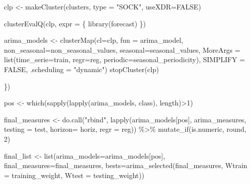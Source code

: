 \documentclass[
]{article}
\newenvironment{Shaded}{\begin{snugshade}}{\end{snugshade}}
\newcommand{\AttributeTok}[1]{\textcolor[rgb]{0.77,0.63,0.00}{#1}}
\newcommand{\ConstantTok}[1]{\textcolor[rgb]{0.00,0.00,0.00}{#1}}
\newcommand{\DecValTok}[1]{\textcolor[rgb]{0.00,0.00,0.81}{#1}}
\newcommand{\FunctionTok}[1]{\textcolor[rgb]{0.00,0.00,0.00}{#1}}
\newcommand{\NormalTok}[1]{#1}
\newcommand{\OtherTok}[1]{\textcolor[rgb]{0.56,0.35,0.01}{#1}}
\newcommand{\SpecialCharTok}[1]{\textcolor[rgb]{0.00,0.00,0.00}{#1}}
\newcommand{\StringTok}[1]{\textcolor[rgb]{0.31,0.60,0.02}{#1}}
\begin{document}
\begin{Shaded}
\begin{Highlighting}[]
\NormalTok{            clp }\OtherTok{\textless{}{-}} \FunctionTok{makeCluster}\NormalTok{(clusters, }\AttributeTok{type =} \StringTok{"SOCK"}\NormalTok{, }\AttributeTok{useXDR=}\ConstantTok{FALSE}\NormalTok{)}

            \FunctionTok{clusterEvalQ}\NormalTok{(clp, }\AttributeTok{expr =}\NormalTok{ \{}
                \FunctionTok{library}\NormalTok{(forecast)}
\NormalTok{            \})}

\NormalTok{            arima\_models }\OtherTok{\textless{}{-}} \FunctionTok{clusterMap}\NormalTok{(}\AttributeTok{cl=}\NormalTok{clp, }\AttributeTok{fun =}\NormalTok{ arima\_model,}
                                       \AttributeTok{non\_seasonal=}\NormalTok{non\_seasonal\_values,}
                                       \AttributeTok{seasonal=}\NormalTok{seasonal\_values,}
                                       \AttributeTok{MoreArgs =} \FunctionTok{list}\NormalTok{(}\AttributeTok{time\_serie=}\NormalTok{train, }\AttributeTok{regr=}\NormalTok{reg, }\AttributeTok{periodic=}\NormalTok{seasonal\_periodicity),}
                                       \AttributeTok{SIMPLIFY =} \ConstantTok{FALSE}\NormalTok{, }\AttributeTok{.scheduling =} \StringTok{"dynamic"}\NormalTok{)}
            \FunctionTok{stopCluster}\NormalTok{(clp)}

\NormalTok{        \})}

\NormalTok{        pos }\OtherTok{\textless{}{-}} \FunctionTok{which}\NormalTok{(}\FunctionTok{sapply}\NormalTok{(}\FunctionTok{lapply}\NormalTok{(arima\_models, class), length)}\SpecialCharTok{\textgreater{}}\DecValTok{1}\NormalTok{)}

\NormalTok{        final\_measures }\OtherTok{\textless{}{-}} \FunctionTok{do.call}\NormalTok{(}\StringTok{"rbind"}\NormalTok{, }\FunctionTok{lapply}\NormalTok{(arima\_models[pos],}
\NormalTok{                                                  arima\_measures,}
                                                  \AttributeTok{testing =}\NormalTok{ test,}
                                                  \AttributeTok{horizon=}\NormalTok{ horiz,}
                                                  \AttributeTok{regr =}\NormalTok{ reg)) }\SpecialCharTok{\%\textgreater{}\%}
            \FunctionTok{mutate\_if}\NormalTok{(is.numeric, round, }\DecValTok{2}\NormalTok{)}
        
\NormalTok{        final\_list }\OtherTok{\textless{}{-}} \FunctionTok{list}\NormalTok{(}\AttributeTok{arima\_models=}\NormalTok{arima\_models[pos],}
                           \AttributeTok{final\_measures=}\NormalTok{final\_measures,}
                           \AttributeTok{bests=}\FunctionTok{arima\_selected}\NormalTok{(final\_measures, }\AttributeTok{Wtrain =}\NormalTok{ training\_weight, }\AttributeTok{Wtest =}\NormalTok{ testing\_weight))}


\end{Highlighting}
\end{Shaded}
\end{document}
